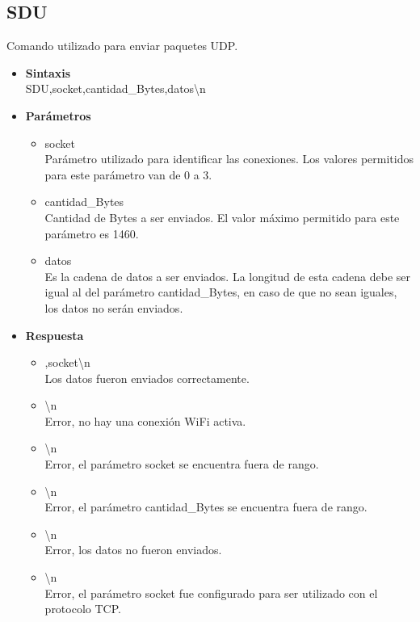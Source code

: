 \documentclass[a4paper,spanish]{article}
\begin{document}
\subsection{SDU}
Comando utilizado para enviar paquetes UDP.   
\begin{itemize}
	\item \textbf{Sintaxis}\\
	{\ttfamily SDU,socket,cantidad\_Bytes,datos\textbackslash n}
	\item \textbf{Parámetros}
	\begin{itemize}
		\item{\ttfamily socket}\\
		Parámetro utilizado para identificar las conexiones. Los valores permitidos para este parámetro van de 0 a 3.
		\item{\ttfamily cantidad\_Bytes}\\
		Cantidad de Bytes a ser enviados. El valor máximo permitido para este parámetro es 1460.
		\item{\ttfamily datos}\\
		Es la cadena de datos a ser enviados. La longitud de esta cadena debe ser igual al del parámetro {\ttfamily cantidad\_Bytes}, en caso de que no sean iguales, los datos no serán enviados.
	\end{itemize}
	\item \textbf{Respuesta}
	\begin{itemize}
		\item{,socket\textbackslash n} \\
		Los datos fueron enviados correctamente.
		\item{\textbackslash n} \\
		Error, no hay una conexión WiFi activa.
		\item{\textbackslash n} \\
		Error, el parámetro {\ttfamily socket} se encuentra fuera de rango.
		\item{\textbackslash n} \\
		Error, el parámetro {\ttfamily cantidad\_Bytes} se encuentra fuera de rango.
		\item{\textbackslash n} \\
		Error, los datos no fueron enviados.
		\item{\textbackslash n} \\
		Error, el parámetro {\ttfamily socket} fue configurado para ser utilizado con el protocolo TCP.		
	\end{itemize}
\end{itemize}
\end{document}
